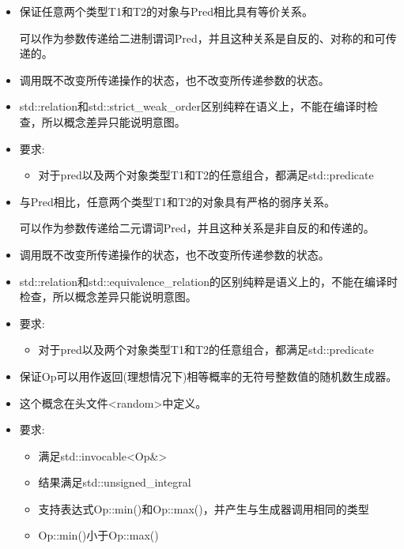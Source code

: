 
\begin{itemize}
\item
保证任意两个类型T1和T2的对象与Pred相比具有等价关系。

可以作为参数传递给二进制谓词Pred，并且这种关系是自反的、对称的和可传递的。

\item
调用既不改变所传递操作的状态，也不改变所传递参数的状态。

\item
std::relation和std::strict\_weak\_order区别纯粹在语义上，不能在编译时检查，所以概念差异只能说明意图。

\item
要求:
\begin{itemize}
\item
对于pred以及两个对象类型T1和T2的任意组合，都满足std::predicate
\end{itemize}
\end{itemize}


\begin{itemize}
\item
与Pred相比，任意两个类型T1和T2的对象具有严格的弱序关系。

可以作为参数传递给二元谓词Pred，并且这种关系是非自反的和传递的。

\item
调用既不改变所传递操作的状态，也不改变所传递参数的状态。

\item
std::relation和std::equivalence\_relation的区别纯粹是语义上的，不能在编译时检查，所以概念差异只能说明意图。

\item
要求:
\begin{itemize}
\item
对于pred以及两个对象类型T1和T2的任意组合，都满足std::predicate
\end{itemize}
\end{itemize}


\begin{itemize}
\item
保证Op可以用作返回(理想情况下)相等概率的无符号整数值的随机数生成器。

\item
这个概念在头文件<random>中定义。

\item
要求:
\begin{itemize}
\item
满足std::invocable<Op\&>

\item
结果满足std::unsigned\_integral

\item
支持表达式Op::min()和Op::max()，并产生与生成器调用相同的类型

\item
Op::min()小于Op::max()
\end{itemize}
\end{itemize}

